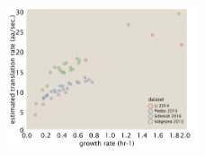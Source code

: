 \documentclass[11pt, letterpaper]{article}
\begin{document}
\begin{figure}[H]
		\centering
    \includegraphics[width=0.5\textwidth]{../../code/figures/SI/estimates_translation_translation_rate.pdf}
  \caption{}
  \label{fig:estimates_translation_rate}
\end{figure}



\end{document}
